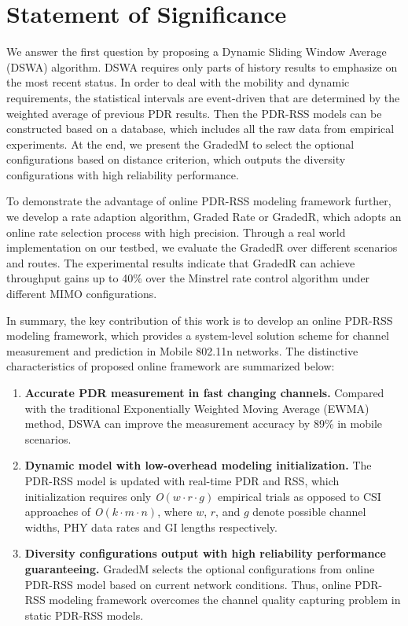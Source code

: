\documentclass[journal,onecolumn,12pt]{IEEEtran}
\begin{document}
\section{Statement of Significance}
We answer the first question by proposing a Dynamic Sliding Window Average (DSWA) algorithm. DSWA requires only parts of history results to emphasize on the most recent status. In order to deal with the mobility and dynamic requirements, the statistical intervals are event-driven that are determined by the weighted average of previous PDR results. Then the PDR-RSS models can be constructed based on a database, which includes all the raw data from empirical experiments. At the end, we present the GradedM to select the optional configurations based on distance criterion, which outputs the diversity configurations with high reliability performance.

To demonstrate the advantage of online PDR-RSS modeling framework further, we develop a rate adaption algorithm, Graded Rate or GradedR, which adopts an online rate selection process with high precision. Through a real world implementation on our testbed, we evaluate the GradedR over different scenarios and routes. The experimental results indicate that GradedR can achieve throughput gains up to 40\% over the Minstrel rate control algorithm under different MIMO configurations.

In summary, the key contribution of this work is to develop an online PDR-RSS modeling framework, which provides a system-level solution scheme for channel measurement and prediction in Mobile 802.11n networks. The distinctive characteristics of proposed online framework are summarized below:
\begin{enumerate}
\item
\textbf{Accurate PDR measurement in fast changing channels.} Compared with the traditional Exponentially Weighted Moving Average (EWMA) method, DSWA can improve the measurement accuracy by 89\% in mobile scenarios.
\item
\textbf{Dynamic model with low-overhead modeling initialization.}  The PDR-RSS model is updated with real-time PDR and RSS, which initialization requires only \textit{O}$(w\cdot r\cdot g)$ empirical trials as opposed to CSI approaches of \textit{O}$(k\cdot m\cdot n)$, where $w$, $r$, and $g$ denote possible channel widths, PHY data rates and GI lengths respectively.
\item
\textbf{Diversity configurations output with high reliability performance guaranteeing.} GradedM selects the optional configurations from online PDR-RSS model based on current network conditions. Thus, online PDR-RSS modeling framework overcomes the channel quality capturing problem in static PDR-RSS models.
\end{enumerate}
\end{document}
